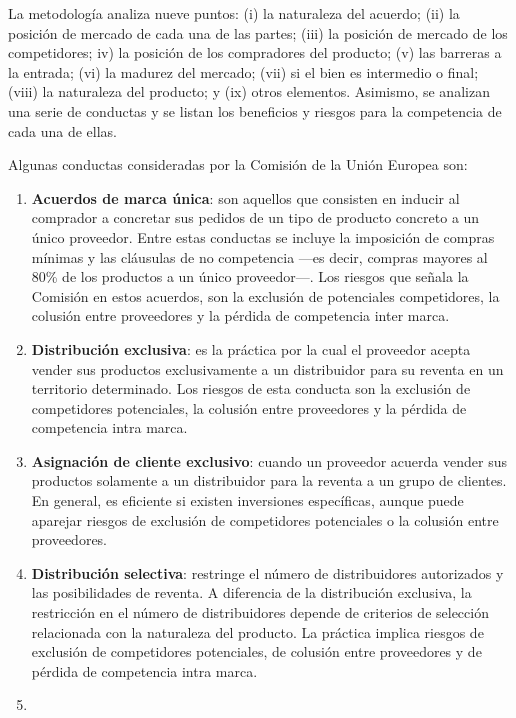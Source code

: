 \documentclass[
  12pt,
  spanish,
]{book}
\begin{document}
La metodología analiza nueve puntos: (i) la naturaleza del acuerdo; (ii) la posición de mercado de cada una de las partes; (iii) la posición de mercado de los competidores; iv) la posición de los compradores del producto; (v) las barreras a la entrada; (vi) la madurez del mercado; (vii) si el bien es intermedio o final; (viii) la naturaleza del producto; y (ix) otros elementos. Asimismo, se analizan una serie de conductas y se listan los beneficios y riesgos para la competencia de cada una de ellas.

Algunas conductas consideradas por la Comisión de la Unión Europea son:

\begin{enumerate}
\def\labelenumi{\arabic{enumi}.}
\item
  \textbf{Acuerdos de marca única}: son aquellos que consisten en inducir al comprador a concretar sus pedidos de un tipo de producto concreto a un único proveedor. Entre estas conductas se incluye la imposición de compras mínimas y las cláusulas de no competencia ---es decir, compras mayores al 80\% de los productos a un único proveedor---. Los riesgos que señala la Comisión en estos acuerdos, son la exclusión de potenciales competidores, la colusión entre proveedores y la pérdida de competencia inter marca.
\item
  \textbf{Distribución exclusiva}: es la práctica por la cual el proveedor acepta vender sus productos exclusivamente a un distribuidor para su reventa en un territorio determinado. Los riesgos de esta conducta son la exclusión de competidores potenciales, la colusión entre proveedores y la pérdida de competencia intra marca.
\item
  \textbf{Asignación de cliente exclusivo}: cuando un proveedor acuerda vender sus productos solamente a un distribuidor para la reventa a un grupo de clientes. En general, es eficiente si existen inversiones específicas, aunque puede aparejar riesgos de exclusión de competidores potenciales o la colusión entre proveedores.
\item
  \textbf{Distribución selectiva}: restringe el número de distribuidores autorizados y las posibilidades de reventa. A diferencia de la distribución exclusiva, la restricción en el número de distribuidores depende de criterios de selección relacionada con la naturaleza del producto. La práctica implica riesgos de exclusión de competidores potenciales, de colusión entre proveedores y de pérdida de competencia intra marca.
\item

\end{enumerate}
\end{document}
